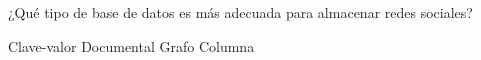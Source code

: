 \question[1] ¿Qué tipo de base de datos es más adecuada para almacenar redes sociales?
\begin{choices}
\choice Clave-valor
\choice Documental
\CorrectChoice Grafo
\choice Columna
\end{choices}